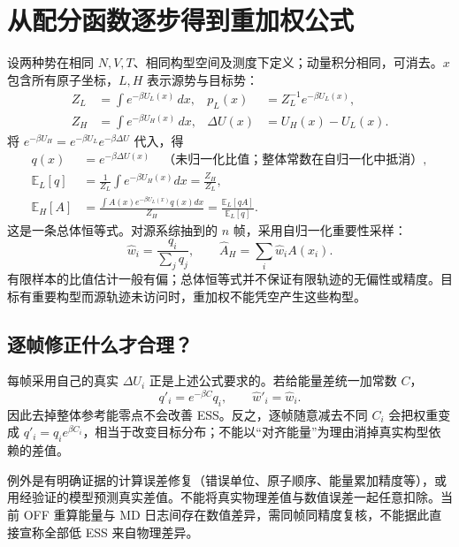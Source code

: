 \documentclass[11pt,a4paper]{article}
\newcommand{\E}{\mathbb E}\newcommand{\Var}{\operatorname{Var}}
\begin{document}
\section{从配分函数逐步得到重加权公式}
设两种势在相同 $N,V,T$、相同构型空间及测度下定义；动量积分相同，可消去。$x$ 包含所有原子坐标，$L,H$ 表示源势与目标势：
\begin{align}
 Z_L&=\int e^{-\beta U_L(x)}\,dx,&p_L(x)&=Z_L^{-1}e^{-\beta U_L(x)},\\
 Z_H&=\int e^{-\beta U_H(x)}\,dx,&\Delta U(x)&=U_H(x)-U_L(x).
\end{align}
将 $e^{-\beta U_H}=e^{-\beta U_L}e^{-\beta\Delta U}$ 代入，得
\begin{align}
q(x)&=e^{-\beta\Delta U(x)}\quad\text{（未归一化比值；整体常数在自归一化中抵消）},\\
\E_L[q]&=\frac1{Z_L}\int e^{-\beta U_H(x)}dx=\frac{Z_H}{Z_L},\\
\E_H[A]&=\frac{\int A(x)e^{-\beta U_L(x)}q(x)dx}{Z_H}
 =\frac{\E_L[qA]}{\E_L[q]}.
\end{align}
这是一条总体恒等式。对源系综抽到的 $n$ 帧，采用自归一化重要性采样：
\begin{equation}
 \hat w_i=\frac{q_i}{\sum_jq_j},\qquad \hat A_H=\sum_i\hat w_i A(x_i).
\end{equation}
有限样本的比值估计一般有偏；总体恒等式并不保证有限轨迹的无偏性或精度。目标有重要构型而源轨迹未访问时，重加权不能凭空产生这些构型。

\subsection{逐帧修正什么才合理？}
每帧采用自己的真实 $\Delta U_i$ 正是上述公式要求的。若给能量差统一加常数 $C$，
\begin{equation}
q'_i=e^{-\beta C}q_i,\qquad \hat w'_i=\hat w_i.
\end{equation}
因此去掉整体参考能零点不会改善 ESS。反之，逐帧随意减去不同 $C_i$ 会把权重变成 $q'_i=q_i e^{\beta C_i}$，相当于改变目标分布；不能以“对齐能量”为理由消掉真实构型依赖的差值。

例外是有明确证据的计算误差修复（错误单位、原子顺序、能量累加精度等），或用经验证的模型预测真实差值。不能将真实物理差值与数值误差一起任意扣除。当前 OFF 重算能量与 MD 日志间存在数值差异，需同帧同精度复核，不能据此直接宣称全部低 ESS 来自物理差异。
\newpage
\end{document}
